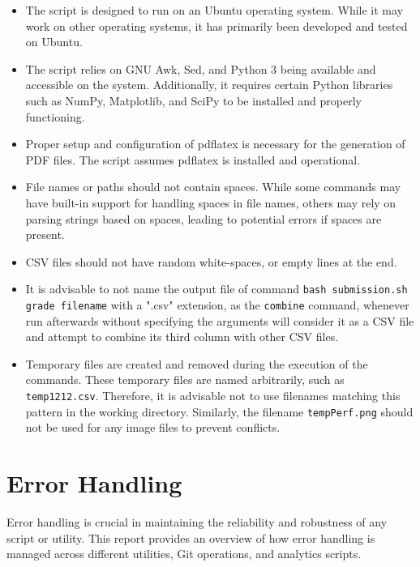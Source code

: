 \documentclass{article}
\begin{document}
\begin{itemize}
\item The script is designed to run on an Ubuntu operating system. While it may work on other operating systems, it has primarily been developed and tested on Ubuntu.

\item The script relies on GNU Awk, Sed, and Python 3 being available and accessible on the system. Additionally, it requires certain Python libraries such as NumPy, Matplotlib, and SciPy to be installed and properly functioning.

\item Proper setup and configuration of pdflatex is necessary for the generation of PDF files. The script assumes pdflatex is installed and operational.

\item File names or paths should not contain spaces. While some commands may have built-in support for handling spaces in file names, others may rely on parsing strings based on spaces, leading to potential errors if spaces are present.

\item CSV files should not have random white-spaces, or empty lines at the end.

\item It is advisable to not name the output file of command \texttt{bash submission.sh grade filename} with a ".csv" extension, as the \texttt{combine} command, whenever run afterwards without specifying the arguments will consider it as a CSV file and attempt to combine its third column with other CSV files. 

\item Temporary files are created and removed during the execution of the commands. These temporary files are named arbitrarily, such as \texttt{temp1212.csv}. Therefore, it is advisable not to use filenames matching this pattern in the working directory. Similarly, the filename \texttt{tempPerf.png} should not be used for any image files to prevent conflicts.
\end{itemize}

\section{Error Handling}

Error handling is crucial in maintaining the reliability and robustness of any script or utility. This report provides an overview of how error handling is managed across different utilities, Git operations, and analytics scripts.
\end{document}
